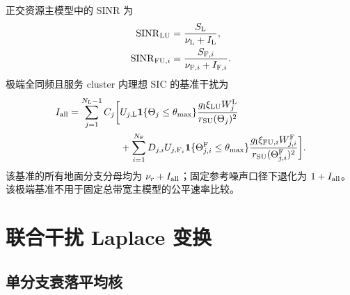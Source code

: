 \documentclass[UTF8,a4paper,11pt]{ctexart}
\newcommand{\ind}{\mathbf 1}
\newcommand{\NL}{N_{\mathrm L}}
\newcommand{\NF}{N_{\mathrm F}}
\newcommand{\SINR}{\operatorname{SINR}}
\newcommand{\thetam}{\theta_{\max}}
\begin{document}
正交资源主模型中的 SINR 为
\begin{align}
 \SINR_{\rm LU}
 &=\frac{S_{\rm L}}{\nu_{\rm L}+I_{\rm L}},\label{eq:sinr-l}\\
 \SINR_{{\rm FU},i}
 &=\frac{S_{{\rm F},i}}{\nu_{{\rm F},i}+I_{{\rm F},i}}.
 \label{eq:sinr-fi}
\end{align}
极端全同频且服务 cluster 内理想 SIC 的基准干扰为
\begin{equation}
\begin{split}
 I_{\rm all}
 =\sum_{j=1}^{\NL-1}C_j\bigg[
 &U_{j,\rm L}\ind\{\Theta_j\leq\thetam\}
 \frac{g_{\rm I}\xi_{\rm LU}W_j^{\rm L}}{r_{\rm SU}(\Theta_j)^2}\\
 &+\sum_{i=1}^{\NF}
 D_{j,i}U_{j,{\rm F}_i}\ind\{\Theta_{j,i}^{\rm F}\leq\thetam\}
 \frac{g_{\rm I}\xi_{{\rm FU},i}W_{j,i}^{\rm F}}
 {r_{\rm SU}(\Theta_{j,i}^{\rm F})^2}
 \bigg].
\end{split}
\label{eq:i-all}
\end{equation}
该基准的所有地面分支分母均为 $\nu_r+I_{\rm all}$；固定参考噪声口径下退化为
$1+I_{\rm all}$。该极端基准不用于固定总带宽主模型的公平速率比较。

\section{联合干扰 Laplace 变换}

\subsection{单分支衰落平均核}
\end{document}

